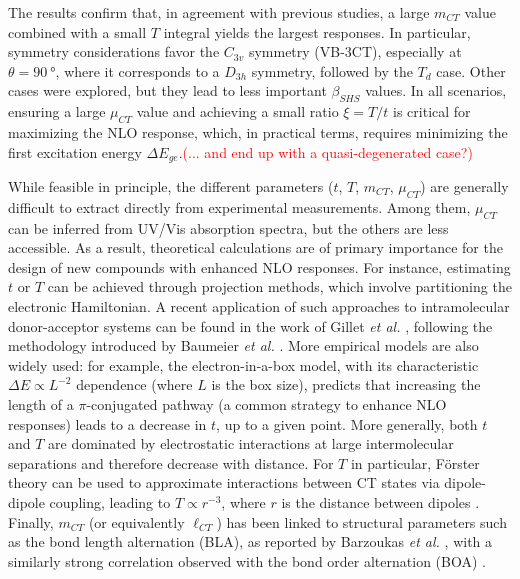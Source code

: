 \documentclass[journal=jpcafh]{achemso}
\begin{document}
The results confirm that, in agreement with previous studies, a large $m_{CT}$ value combined with a small $T$ integral yields the largest responses. In particular, symmetry considerations favor the $C_{3v}$ symmetry (VB-3CT), especially at $\theta = \SI{90}{\degree}$, where it corresponds to a $D_{3h}$ symmetry, followed by the $T_d$ case. Other cases were explored, but they lead to less important $\beta_{SHS}$ values.
In all scenarios, ensuring a large $\mu_{CT}$ value and achieving a small ratio $\xi = T/t$ is critical for maximizing the NLO response, which, in practical terms, requires minimizing the first excitation energy $\Delta E_{ge}$.\textcolor{red}{(... and end up with a quasi-degenerated case?)}

While feasible in principle, the different parameters ($t$, $T$, $m_{CT}$, $\mu_{CT}$) are generally difficult to extract directly from experimental measurements. Among them, $\mu_{CT}$ can be inferred from UV/Vis absorption spectra, but the others are less accessible. As a result, theoretical calculations are of primary importance for the design of new compounds with enhanced NLO responses.
For instance, estimating $t$ or $T$ can be achieved through projection methods, which involve partitioning the electronic Hamiltonian. A recent application of such approaches to intramolecular donor-acceptor systems can be found in the work of Gillet \emph{et al.} \cite{gilletElectronicCouplingCalculations2016}, following the methodology introduced by Baumeier \emph{et al.} \cite{baumeierDensityfunctionalBasedDetermination2010}. More empirical models are also widely used: for example, the electron-in-a-box model, with its characteristic $\Delta E \propto L^{-2}$ dependence (where $L$ is the box size), predicts that increasing the length of a $\pi$-conjugated pathway (a common strategy to enhance NLO responses) leads to a decrease in $t$, up to a given point\cite{luValenceBondChargeTransferModel1994}.
More generally, both $t$ and $T$ are dominated by electrostatic interactions at large intermolecular separations and therefore decrease with distance. For $T$ in particular, Förster theory can be used to approximate interactions between CT states via dipole-dipole coupling, leading to $T \propto r^{-3}$, where $r$ is the distance between dipoles \cite{sistoInitioNonadiabaticDynamics2014}.
Finally, $m_{CT}$ (or equivalently $\ell_{CT}$) has been linked to structural parameters such as the bond length alternation (BLA), as reported by Barzoukas \emph{et al.} \cite{barzoukasTWOFORMDESCRIPTIONPUSHPULL1996,barzoukasTwostateDescriptionHyper1996}, with a similarly strong correlation observed with the bond order alternation (BOA) \cite{dellaiDynamicEffectsNonlinear2024}.
\end{document}
